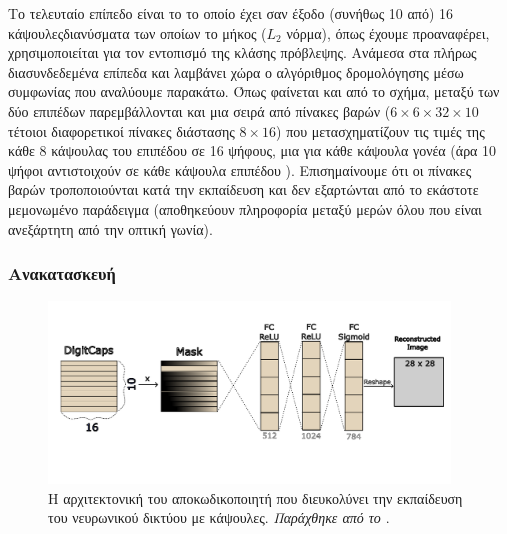 Το τελευταίο επίπεδο είναι το  το οποίο έχει σαν έξοδο (συνήθως 10 από) 16 κάψουλες\textendash διανύσματα των οποίων το μήκος ($L_2$ νόρμα), όπως έχουμε προαναφέρει, χρησιμοποιείται για τον εντοπισμό της κλάσης πρόβλεψης. Ανάμεσα στα πλήρως διασυνδεδεμένα επίπεδα  και  λαμβάνει χώρα ο αλγόριθμος δρομολόγησης μέσω συμφωνίας που αναλύουμε παρακάτω. Όπως φαίνεται και από το σχήμα, μεταξύ των δύο επιπέδων παρεμβάλλονται και μια σειρά από πίνακες βαρών ($6\times 6 \times 32 \times 10$ τέτοιοι διαφορετικοί πίνακες διάστασης $8 \times 16$) που μετασχηματίζουν τις τιμές της κάθε 8 κάψουλας του επιπέδου  σε 16 ψήφους, μια για κάθε κάψουλα γονέα (άρα 10 ψήφοι αντιστοιχούν σε κάθε κάψουλα επιπέδου ). Επισημαίνουμε ότι οι πίνακες βαρών τροποποιούνται κατά την εκπαίδευση και δεν εξαρτώνται από το εκάστοτε μεμονωμένο παράδειγμα (αποθηκεύουν πληροφορία μεταξύ μερών \textendash όλου που είναι ανεξάρτητη από την οπτική γωνία).\par

\subsubsection{Ανακατασκευή}
\begin{figure}[h]
    \centering
    \includegraphics[width=0.95\textwidth]{images/chapter method/first_method_decoder.pdf}
    \caption{Η αρχιτεκτονική του αποκωδικοποιητή που διευκολύνει την εκπαίδευση του νευρωνικού δικτύου με κάψουλες. \textit{Παράχθηκε από το \href{https://inkscape.org/}{}}.}
    \label{fig:method_1_decoder_architecture}
  \end{figure}

